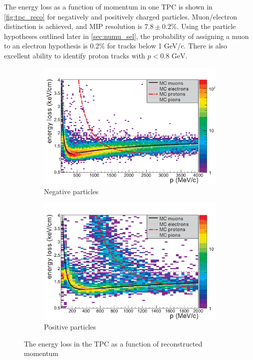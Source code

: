 The energy loss as a function of momentum in one TPC is shown in \autoref{fig:tpc_reco} for negatively and positively charged particles. Muon/electron distinction is achieved, and MIP resolution is $7.8\pm0.2\%$. Using the particle hypotheses outlined later in \autoref{sec:numu_sel}, the probability of assigning a muon to an electron hypothesis is 0.2\% for tracks below 1 GeV/c\cite{thesis_tpc}. There is also excellent ability to identify proton tracks with $p < 0.8 \text{ GeV}$.
\begin{figure}[h]
	\begin{subfigure}[t]{0.47\textwidth}
		\includegraphics[width=\textwidth, trim={0mm 0mm 0mm 0mm}, clip,page=1]{figures/numu/TPC_PID_neg}
		\caption{Negative particles}
	\end{subfigure}
	\begin{subfigure}[t]{0.47\textwidth}
		\includegraphics[width=\textwidth, trim={0mm 0mm 0mm 0mm}, clip,page=1]{figures/numu/TPC_PID_pos}
		\caption{Positive particles}
	\end{subfigure}	
	\caption{The energy loss in the TPC as a function of reconstructed momentum}
	\label{fig:tpc_reco}
\end{figure}

